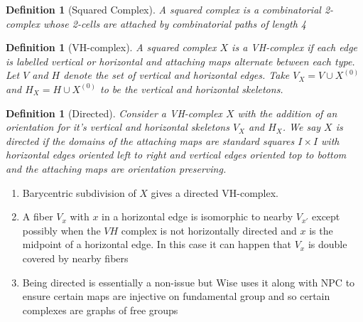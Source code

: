 \documentclass{article}
\theoremstyle{mystyle}
\newtheorem{defn}[thm]{Definition}
\theoremstyle{remark}
\begin{document}
\begin{defn}
    [Squared Complex]
    A \emph{squared complex} is a combinatorial 2-complex whose 2-cells are attached by combinatorial paths of length 4
\end{defn}
\begin{defn}
    [VH-complex]
    A squared complex $X$ is a \emph{VH-complex} if each edge is labelled vertical or horizontal and attaching maps alternate between each type. Let $V$ and $H$ denote the set of vertical and horizontal edges. Take $V_X = V \cup X^{(0)}$ and $H_X = H \cup X^{(0)}$ to be the vertical and horizontal skeletons.
\end{defn}
\begin{defn}
    [Directed]
    Consider a VH-complex $X$ with the addition of an orientation for it's vertical and horizontal skeletons $V_X$ and $H_X$. We say $X$ is \emph{directed} if the domains of the attaching maps are standard squares $I \times I$ with horizontal edges oriented left to right and vertical edges oriented top to bottom and the attaching maps are orientation preserving.
\end{defn}
\begin{enumerate}
    \item Barycentric subdivision of $X$ gives a directed VH-complex.
    \item A fiber $V_x$ with $x$ in a horizontal edge is isomorphic to nearby $V_{x'}$ except possibly when the $VH$ complex is not horizontally directed and $x$ is the midpoint of a horizontal edge. In this case it can happen that $V_x$ is double covered by nearby fibers
    \item Being directed is essentially a non-issue but Wise uses it along with NPC to ensure certain maps are injective on fundamental group and so certain complexes are graphs of free groups
\end{enumerate}


\end{document}

